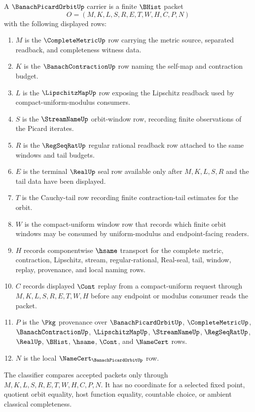 \begin{definition}
\label{def:banach-picard-orbit-carrier}
A $\BanachPicardOrbitUp$ carrier is a finite $\BHist$ packet
$$
O=(M,K,L,S,R,E,T,W,H,C,P,N)
$$
with the following displayed rows:
\begin{enumerate}
\item $M$ is the $\CompleteMetricUp$ row carrying the metric source, separated readback, and completeness witness data.
\item $K$ is the $\BanachContractionUp$ row naming the self-map and contraction budget.
\item $L$ is the $\LipschitzMapUp$ row exposing the Lipschitz readback used by compact-uniform-modulus consumers.
\item $S$ is the $\StreamNameUp$ orbit-window row, recording finite observations of the Picard iterates.
\item $R$ is the $\RegSeqRatUp$ regular rational readback row attached to the same windows and tail budgets.
\item $E$ is the terminal $\RealUp$ seal row available only after $M,K,L,S,R$ and the tail data have been displayed.
\item $T$ is the Cauchy-tail row recording finite contraction-tail estimates for the orbit.
\item $W$ is the compact-uniform window row that records which finite orbit windows may be consumed by uniform-modulus and endpoint-facing readers.
\item $H$ records componentwise $\hsame$ transport for the complete metric, contraction, Lipschitz, stream, regular-rational, Real-seal, tail, window, replay, provenance, and local naming rows.
\item $C$ records displayed $\Cont$ replay from a compact-uniform request through $M,K,L,S,R,E,T,W,H$ before any endpoint or modulus consumer reads the packet.
\item $P$ is the $\Pkg$ provenance over $\BanachPicardOrbitUp$, $\CompleteMetricUp$, $\BanachContractionUp$, $\LipschitzMapUp$, $\StreamNameUp$, $\RegSeqRatUp$, $\RealUp$, $\BHist$, $\hsame$, $\Cont$, and $\NameCert$ rows.
\item $N$ is the local $\NameCert_{\BanachPicardOrbitUp}$ row.
\end{enumerate}
The classifier compares accepted packets only through $M,K,L,S,R,E,T,W,H,C,P,N$. It has no coordinate for a selected fixed point, quotient orbit equality, host function equality, countable choice, or ambient classical completeness.
\end{definition}

